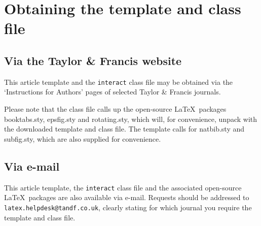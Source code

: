 \documentclass[]{interact}
\theoremstyle{plain}%
\theoremstyle{definition}
\theoremstyle{remark}
\begin{document}
\section{Obtaining the template and class file}

\subsection{Via the Taylor \& Francis website}

This article template and the \texttt{interact} class file may be obtained via the `Instructions for Authors' pages of selected Taylor \& Francis journals.

Please note that the class file calls up the open-source \LaTeX\ packages booktabs.sty, epsfig.sty and rotating.sty, which will, for convenience, unpack with the downloaded template and class file. The template calls for natbib.sty and subfig.sty, which are also supplied for convenience.


\subsection{Via e-mail}

This article template, the \texttt{interact} class file and the associated open-source \LaTeX\ packages are also available via e-mail. Requests should be addressed to \texttt{latex.helpdesk@tandf.co.uk}, clearly stating for which journal you require the template and class file.
\end{document}
